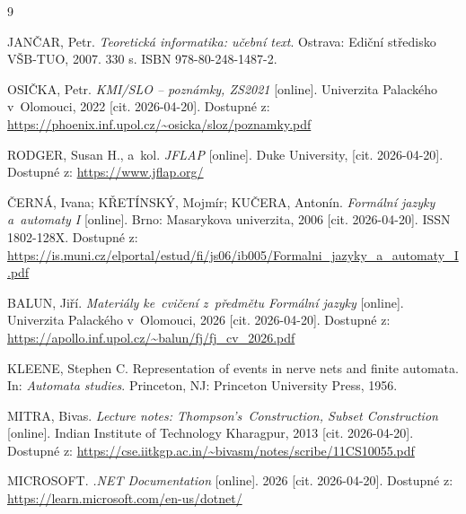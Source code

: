 \documentclass[
  master,
  program=ainfvs,
  printversion,
  figures=false,
  tables=false,
  glossaries,
  index
]{kidiplom}
\begin{document}
 \printglossary


\nocite{*}

\begin{thebibliography}{9}

 \uppercase{JanČar}, Petr. \textit{Teoretická informatika: učební text}. Ostrava: Ediční středisko VŠB-TUO, 2007. 330 s. ISBN 978-80-248-1487-2.

 OSIČKA, Petr. \textit{KMI/SLO -- poznámky, ZS2021} [online]. Univerzita Palackého v~Olomouci, 2022 [cit. 2026-04-20]. Dostupné z: \url{https://phoenix.inf.upol.cz/~osicka/sloz/poznamky.pdf}

 \uppercase{Rodger}, Susan H., a~kol. \textit{JFLAP} [online]. Duke University, [cit. 2026-04-20]. Dostupné z: \url{https://www.jflap.org/}

 ČERNÁ, Ivana; KŘETÍNSKÝ, Mojmír; KUČERA, Antonín. \textit{Formální jazyky a~automaty I} [online]. Brno: Masarykova univerzita, 2006 [cit. 2026-04-20]. ISSN 1802-128X. Dostupné z: \url{https://is.muni.cz/elportal/estud/fi/js06/ib005/Formalni_jazyky_a_automaty_I.pdf}

 \uppercase{Balun}, Jiří. \textit{Materiály ke~cvičení z~předmětu Formální jazyky} [online]. Univerzita Palackého v~Olomouci, 2026 [cit. 2026-04-20]. Dostupné z: \url{https://apollo.inf.upol.cz/~balun/fj/fj_cv_2026.pdf}

 \uppercase{Kleene}, Stephen C. Representation of events in nerve nets and finite automata. In: \textit{Automata studies}. Princeton, NJ: Princeton University Press, 1956.

 \uppercase{Mitra}, Bivas. \textit{Lecture notes: Thompson's~Construction, Subset Construction} [online]. Indian Institute of Technology Kharagpur, 2013 [cit. 2026-04-20]. Dostupné z: \url{https://cse.iitkgp.ac.in/~bivasm/notes/scribe/11CS10055.pdf}

 \uppercase{Microsoft}. \textit{.NET Documentation} [online]. 2026 [cit. 2026-04-20]. Dostupné z: \url{https://learn.microsoft.com/en-us/dotnet/}


\end{thebibliography}
\end{document}
